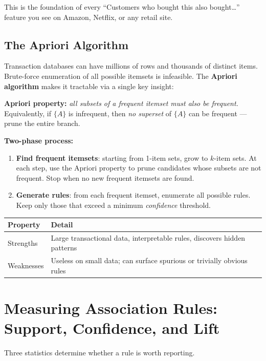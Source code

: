 \documentclass[11pt]{article}
\begin{document}
This is the foundation of every ``Customers who bought this also bought\ldots''
feature you see on Amazon, Netflix, or any retail site.

\subsection{The Apriori Algorithm}
Transaction databases can have millions of rows and thousands of distinct items.
Brute-force enumeration of all possible itemsets is infeasible.
The \textbf{Apriori algorithm} makes it tractable via a single key insight:

\textbf{Apriori property:} \textit{all subsets of a frequent itemset must
also be frequent.} Equivalently, if $\{A\}$ is infrequent, then
\emph{no superset} of $\{A\}$ can be frequent --- prune the entire branch.

\textbf{Two-phase process:}
\begin{enumerate}
    \item \textbf{Find frequent itemsets}: starting from 1-item sets, grow to
      $k$-item sets. At each step, use the Apriori property to prune candidates
      whose subsets are not frequent. Stop when no new frequent itemsets are found.
    \item \textbf{Generate rules}: from each frequent itemset, enumerate all
      possible rules. Keep only those that exceed a minimum \emph{confidence}
      threshold.
\end{enumerate}

\begin{center}
\begin{tabular}{@{}ll@{}}
\toprule
\textbf{Property} & \textbf{Detail} \\
\midrule
Strengths & Large transactional data, interpretable rules, discovers hidden patterns \\
Weaknesses & Useless on small data; can surface spurious or trivially obvious rules \\
\bottomrule
\end{tabular}
\end{center}


\section{Measuring Association Rules: Support, Confidence, and Lift}

Three statistics determine whether a rule is worth reporting.
\end{document}
